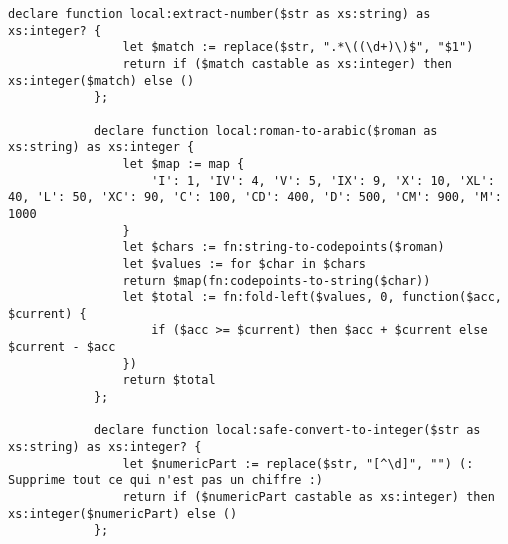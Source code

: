 \begin{lstlisting}[breaklines=true]
			declare function local:extract-number($str as xs:string) as xs:integer? {
				let $match := replace($str, ".*\((\d+)\)$", "$1")
				return if ($match castable as xs:integer) then xs:integer($match) else ()
			};
			
			declare function local:roman-to-arabic($roman as xs:string) as xs:integer {
				let $map := map {
					'I': 1, 'IV': 4, 'V': 5, 'IX': 9, 'X': 10, 'XL': 40, 'L': 50, 'XC': 90, 'C': 100, 'CD': 400, 'D': 500, 'CM': 900, 'M': 1000
				}
				let $chars := fn:string-to-codepoints($roman)
				let $values := for $char in $chars
				return $map(fn:codepoints-to-string($char))
				let $total := fn:fold-left($values, 0, function($acc, $current) {
					if ($acc >= $current) then $acc + $current else $current - $acc
				})
				return $total
			};
			
			declare function local:safe-convert-to-integer($str as xs:string) as xs:integer? {
				let $numericPart := replace($str, "[^\d]", "") (: Supprime tout ce qui n'est pas un chiffre :)
				return if ($numericPart castable as xs:integer) then xs:integer($numericPart) else ()
			};
		\end{lstlisting}